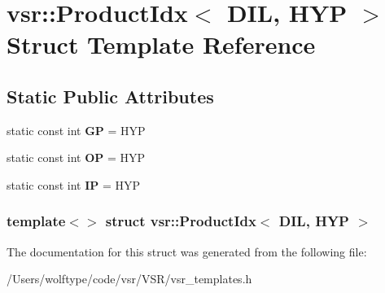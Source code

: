 \hypertarget{structvsr_1_1_product_idx_3_01_d_i_l_00_01_h_y_p_01_4}{\section{vsr\-:\-:Product\-Idx$<$ D\-I\-L, H\-Y\-P $>$ Struct Template Reference}
\label{structvsr_1_1_product_idx_3_01_d_i_l_00_01_h_y_p_01_4}
}
\subsection*{Static Public Attributes}
\begin{DoxyCompactItemize}
\item 
\hypertarget{structvsr_1_1_product_idx_3_01_d_i_l_00_01_h_y_p_01_4_acb79a6ee875bac586e094962d40436c0}{static const int {\bfseries G\-P} = H\-Y\-P}\label{structvsr_1_1_product_idx_3_01_d_i_l_00_01_h_y_p_01_4_acb79a6ee875bac586e094962d40436c0}

\item 
\hypertarget{structvsr_1_1_product_idx_3_01_d_i_l_00_01_h_y_p_01_4_a0f74ff066c3a163aa4dc5f165390d15f}{static const int {\bfseries O\-P} = H\-Y\-P}\label{structvsr_1_1_product_idx_3_01_d_i_l_00_01_h_y_p_01_4_a0f74ff066c3a163aa4dc5f165390d15f}

\item 
\hypertarget{structvsr_1_1_product_idx_3_01_d_i_l_00_01_h_y_p_01_4_a5946636dd22f68772e8f177c9cb64f9a}{static const int {\bfseries I\-P} = H\-Y\-P}\label{structvsr_1_1_product_idx_3_01_d_i_l_00_01_h_y_p_01_4_a5946636dd22f68772e8f177c9cb64f9a}

\end{DoxyCompactItemize}
\subsubsection*{template$<$$>$ struct vsr\-::\-Product\-Idx$<$ D\-I\-L, H\-Y\-P $>$}



The documentation for this struct was generated from the following file\-:\begin{DoxyCompactItemize}
\item 
/\-Users/wolftype/code/vsr/\-V\-S\-R/vsr\-\_\-templates.\-h\end{DoxyCompactItemize}
